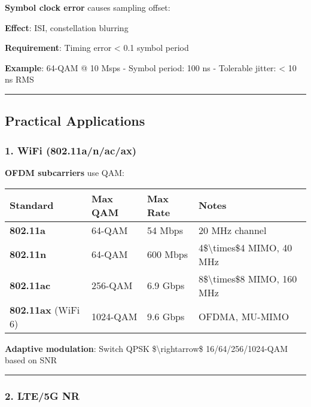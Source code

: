 \textbf{Symbol clock error} causes sampling offset:

\textbf{Effect}: ISI, constellation blurring

\textbf{Requirement}: Timing error \textless{} 0.1 symbol period

\textbf{Example}: 64-QAM @ 10 Msps - Symbol period: 100 ns - Tolerable
jitter: \textless{} 10 ns RMS

\begin{center}\rule{0.5\linewidth}{0.5pt}\end{center}

\subsection{Practical Applications}\label{practical-applications}

\subsubsection{1. WiFi (802.11a/n/ac/ax)}\label{wifi-802.11anacax}

\textbf{OFDM subcarriers} use QAM:

{\def\LTcaptype{} %
\begin{longtable}[]{@{}llll@{}}
\toprule\noalign{}
Standard & Max QAM & Max Rate & Notes \\
\midrule\noalign{}
\endhead
\bottomrule\noalign{}
\endlastfoot
\textbf{802.11a} & 64-QAM & 54 Mbps & 20 MHz channel \\
\textbf{802.11n} & 64-QAM & 600 Mbps & 4\$\textbackslash times\$4 MIMO,
40 MHz \\
\textbf{802.11ac} & 256-QAM & 6.9 Gbps & 8\$\textbackslash times\$8
MIMO, 160 MHz \\
\textbf{802.11ax} (WiFi 6) & 1024-QAM & 9.6 Gbps & OFDMA, MU-MIMO \\
\end{longtable}
}

\textbf{Adaptive modulation}: Switch QPSK \$\textbackslash rightarrow\$
16/64/256/1024-QAM based on SNR

\begin{center}\rule{0.5\linewidth}{0.5pt}\end{center}

\subsubsection{2. LTE/5G NR}\label{lte5g-nr}

